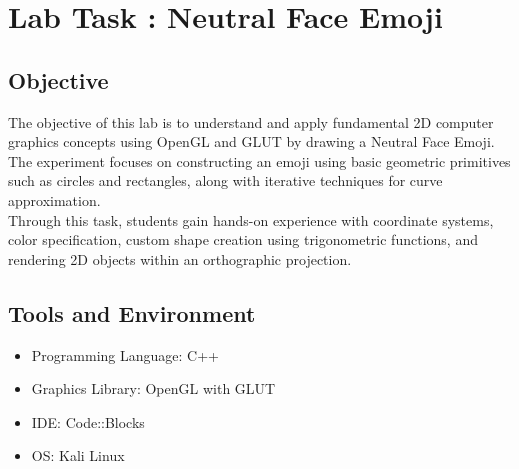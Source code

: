 \documentclass[12pt]{article}
\begin{document}
\section{Lab Task : Neutral Face Emoji}
\subsection{Objective}
The objective of this lab is to understand and apply fundamental 2D computer graphics concepts using OpenGL and GLUT by drawing a Neutral Face Emoji. The experiment focuses on constructing an emoji using basic geometric primitives such as circles and rectangles, along with iterative techniques for curve approximation. \\
Through this task, students gain hands-on experience with coordinate systems, color specification, custom shape creation using trigonometric functions, and rendering 2D objects within an orthographic projection.

\subsection{Tools and Environment}
\begin{itemize}
    \item Programming Language: C++
    \item Graphics Library: OpenGL with GLUT
    \item IDE: Code::Blocks
    \item OS: Kali Linux
\end{itemize}
\end{document}
